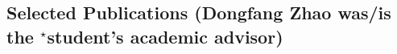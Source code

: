 \documentclass[11pt,]{scrartcl}
\begin{document}












\subsection{Selected Publications
(Dongfang Zhao was/is the $^\star$student's academic advisor)}
\label{publications}




\end{document}
